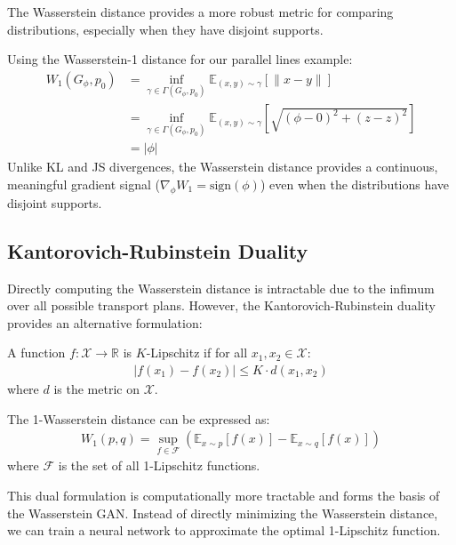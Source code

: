 The Wasserstein distance provides a more robust metric for comparing distributions, especially when they have disjoint supports.

\begin{example}
  Using the Wasserstein-1 distance for our parallel lines example:
  \begin{align}
    W_1(G_\phi, p_0) &= \inf_{\gamma \in \Gamma(G_\phi, p_0)} \mathbb{E}_{(x,y) \sim \gamma}[\|x - y\|] \\
    &= \inf_{\gamma \in \Gamma(G_\phi, p_0)} \mathbb{E}_{(x,y) \sim \gamma}[\sqrt{(\phi - 0)^2 + (z - z)^2}] \\
    &= |\phi|
  \end{align}
  Unlike KL and JS divergences, the Wasserstein distance provides a continuous, meaningful gradient signal ($\nabla_\phi W_1 = \text{sign}(\phi)$) even when the distributions have disjoint supports.
\end{example}

\subsection{Kantorovich-Rubinstein Duality}

Directly computing the Wasserstein distance is intractable due to the infimum over all possible transport plans. However, the Kantorovich-Rubinstein duality provides an alternative formulation:

\begin{definition}
  A function $f: \mathcal{X} \to \mathbb{R}$ is \textnormal{\sffamily $K$-Lipschitz} if for all $x_1, x_2 \in \mathcal{X}$:
  \begin{align}
    |f(x_1) - f(x_2)| \leq K \cdot d(x_1, x_2)
  \end{align}
  where $d$ is the metric on $\mathcal{X}$.
\end{definition}

\begin{theorem}
  \label{thm:kr-duality}
  The 1-Wasserstein distance can be expressed as:
  \begin{align}
    W_1(p, q) = \sup_{f \in \mathcal{F}} \left( \mathbb{E}_{x \sim p}[f(x)] - \mathbb{E}_{x \sim q}[f(x)] \right)
  \end{align}
  where $\mathcal{F}$ is the set of all 1-Lipschitz functions.
\end{theorem}

This dual formulation is computationally more tractable and forms the basis of the Wasserstein GAN. Instead of directly minimizing the Wasserstein distance, we can train a neural network to approximate the optimal 1-Lipschitz function.

